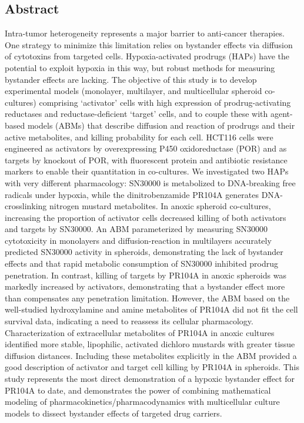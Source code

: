 \documentclass[11pt,a4paper]{article}
\begin{document}
\subsection*{Abstract}
Intra-tumor heterogeneity represents a major barrier to anti-cancer therapies. One strategy to minimize this limitation relies on bystander effects via diffusion of cytotoxins from targeted cells. Hypoxia-activated prodrugs (HAPs) have the potential to exploit hypoxia in this way, but robust methods for measuring bystander effects are lacking. The objective of this study is to develop experimental models (monolayer, multilayer, and multicellular spheroid co-cultures) comprising ‘activator’ cells with high expression of prodrug-activating reductases and reductase-deficient ‘target’ cells, and to couple these with agent-based models (ABMs) that describe diffusion and reaction of prodrugs and their active metabolites, and killing probability for each cell. HCT116 cells were engineered as activators by overexpressing P450 oxidoreductase (POR) and as targets by knockout of POR, with fluorescent protein and antibiotic resistance markers to enable their quantitation in co-cultures. We investigated two HAPs with very different pharmacology: SN30000 is metabolized to DNA-breaking free radicals under hypoxia, while the dinitrobenzamide PR104A generates DNA-crosslinking nitrogen mustard metabolites. In anoxic spheroid co-cultures, increasing the proportion of activator cells decreased killing of both activators and targets by SN30000. An ABM parameterized by measuring SN30000 cytotoxicity in monolayers and diffusion-reaction in multilayers accurately predicted SN30000 activity in spheroids, demonstrating the lack of bystander effects and that rapid metabolic consumption of SN30000 inhibited prodrug penetration. In contrast, killing of targets by PR104A in anoxic spheroids was markedly increased by activators, demonstrating that a bystander effect more than compensates any penetration limitation. However, the ABM based on the well-studied hydroxylamine and amine metabolites of PR104A did not fit the cell survival data, indicating a need to reassess its cellular pharmacology. Characterization of extracellular metabolites of PR104A in anoxic cultures identified more stable, lipophilic, activated dichloro mustards with greater tissue diffusion distances. Including these metabolites explicitly in the ABM provided a good description of activator and target cell killing by PR104A in spheroids. This study represents the most direct demonstration of a hypoxic bystander effect for PR104A to date, and demonstrates the power of combining mathematical modeling of pharmacokinetics/pharmacodynamics with multicellular culture models to dissect bystander effects of targeted drug carriers.
\end{document}
